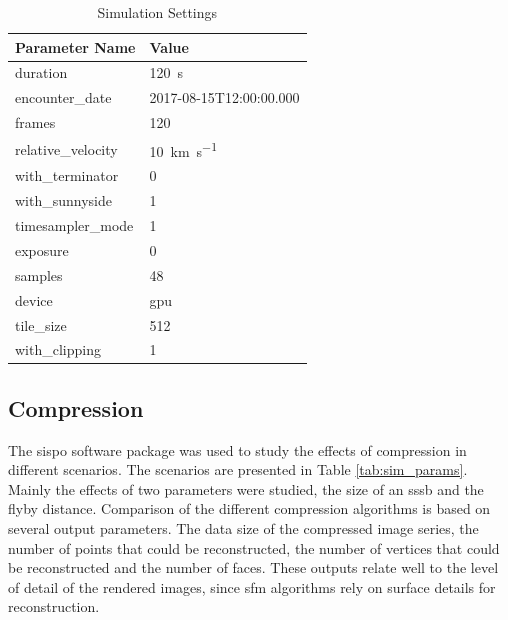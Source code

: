 \begin{table}[htpb]
    \centering
    \caption{Simulation Settings}
    \label{tab:sim_settings}
    \begin{tabular}{l|l}
        \textbf{Parameter Name} & \textbf{Value} \\ \hline
        duration       & \SI{120}{\second}   \\
        encounter\_date & 2017-08-15T12:00:00.000\\
        frames       & \SI{120}{}     \\
        relative\_velocity     &  \SI{10}{\kilo\meter\per\second} \\
        with\_terminator  & \SI{0}{} \\
        with\_sunnyside & \SI{1}{} \\
        timesampler\_mode & \SI{1}{} \\
        exposure & \SI{0}{} \\
        samples & \SI{48}{} \\
        device & \gls{gpu} \\
        tile\_size & \SI{512}{} \\
        with\_clipping & \SI{1}{}
    \end{tabular}
\end{table}


\subsection{Compression} \label{sec:results_comp}
The \gls{sispo} software package was used to study the effects of compression in different scenarios. The scenarios are presented in Table \ref{tab:sim_params}. Mainly the effects of two parameters were studied, the size of an \gls{sssb} and the flyby distance. Comparison of the different compression algorithms is based on several output parameters. The data size of the compressed image series, the number of points that could be reconstructed, the number of vertices that could be reconstructed and the number of faces. These outputs relate well to the level of detail of the rendered images, since \gls{sfm} algorithms rely on surface details for reconstruction.


